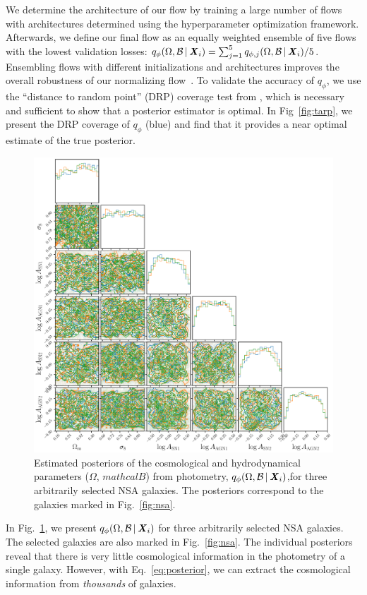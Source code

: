We determine the architecture of our flow by training a large number of flows
with architectures determined using the \cite{akiba2019} hyperparameter optimization framework.
Afterwards, we define our final flow as an equally weighted ensemble of five
flows with the lowest validation losses: 
$q_{\phi}(\Omega, \mathcal{B}\,|\, {\textbf{\textit{X}}_i}) = 
\sum_{j=1}^5 q_{\phi,j}(\Omega, \mathcal{B}\,|\, {\textbf{\textit{X}}_i})/5$. 
Ensembling flows with different initializations and architectures improves the
overall robustness of our normalizing flow~\citep{alsing2019}.
To validate the accuracy of $q_\phi$, we use the ``distance to random point''
(DRP) coverage test from \cite{lemos2023}, which is necessary and sufficient to
show that a posterior estimator is optimal. 
In Fig~\ref{fig:tarp}, we present the DRP coverage of $q_\phi$ (blue) and
find that it provides a near optimal estimate of the true posterior.


\begin{figure}[ht]
\vskip 0.2in
\begin{center}
    \centerline{\includegraphics[width=\columnwidth]{figs/p_omega_x_i.pdf}}
    \caption{Estimated posteriors of the cosmological and hydrodynamical 
    parameters ($\Omega$, $mathcal{B}$) from photometry, 
    $q_{\phi}(\Omega, \mathcal{B}\,|\, {\textbf{\textit{X}}_i})$,for three arbitrarily 
    selected NSA galaxies. 
    The posteriors correspond to the galaxies marked in Fig.~\ref{fig:nsa}.
    }\label{fig:p_omega_x_i}
\end{center}
\vskip -0.2in
\end{figure}

In Fig.~\ref{fig:p_omega_x_i}, we present 
$q_{\phi}(\Omega, \mathcal{B}\,|\, {\textbf{\textit{X}}_i})$
for three arbitrarily selected NSA galaxies. 
The selected galaxies are also marked in Fig.~\ref{fig:nsa}. 
The individual posteriors reveal that  there is very little cosmological
information in the photometry of a single galaxy. 
However, with Eq.~\ref{eq:posterior}, we can extract the cosmological
information from {\em thousands} of galaxies.

